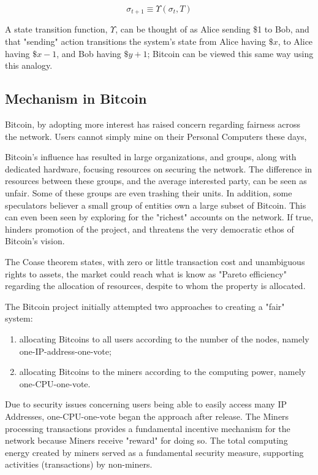 \documentclass[12pt, titlepage, twocolumn]{report}
\begin{document}
\begin{equation}
\sigma_{t+1} \equiv \Upsilon (\sigma_t,T)
\end{equation}

A state transition function, \(\Upsilon\), can be thought of as Alice sending \$1 to Bob, and that "sending" action transitions the system's state from Alice having \(\$x\), to Alice having \(\$x-1\), and Bob having \(\$y + 1\); Bitcoin can be viewed this same way using this analogy. 




\subsection{Mechanism in Bitcoin}
Bitcoin, by adopting more interest has raised concern regarding fairness across the network. Users cannot simply mine on their Personal Computers these days,

Bitcoin's influence has resulted in large organizations, and groups, along with dedicated hardware, focusing resources on securing the network. The difference in resources between these groups, and the average interested party, can be seen as unfair. Some of these groups are even trashing their units. In addition, some speculators believer a small group of entities own a large subset of Bitcoin. This can even been seen by exploring for the "richest" accounts on the network. If true, hinders promotion of the project, and threatens the very democratic ethos of Bitcoin's vision. 

The Coase theorem states, with zero or little transaction cost and unambiguous rights to assets, the market could reach what is know as "Pareto efficiency" regarding the allocation of resources, despite to whom the property is allocated. 

The Bitcoin project initially attempted two approaches to creating a "fair" system: 

\begin{enumerate}
	\item allocating Bitcoins to all users according to the number of the nodes, namely one-IP-address-one-vote; 
	\item allocating Bitcoins to the miners according to the computing power, namely one-CPU-one-vote.
\end{enumerate}
 
 
 Due to security issues concerning users being able to easily access many IP Addresses, one-CPU-one-vote began the approach after release. The Miners processing transactions provides a fundamental incentive mechanism for the network because Miners receive "reward" for doing so. The total computing energy created by miners served as a fundamental security measure, supporting activities (transactions) by non-miners.
\end{document}
